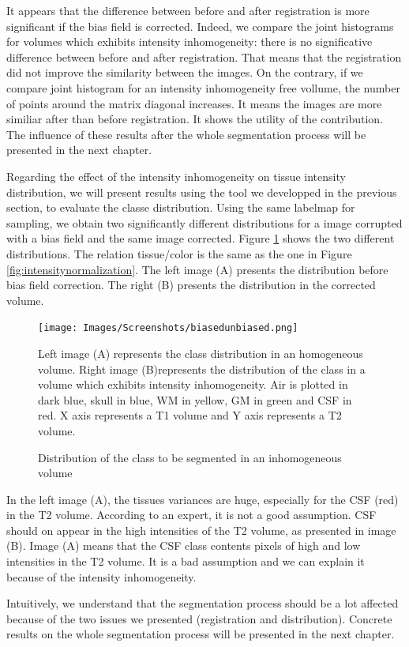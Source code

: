 It appears that the difference between before and after registration is more significant if the bias field is corrected. Indeed, we compare the joint histograms for volumes which exhibits intensity inhomogeneity: there is no significative difference between before and after registration. That means that the registration did not improve the similarity between the images. On the contrary, if we compare joint histogram for an intensity inhomogeneity free vollume, the number of points around the matrix diagonal increases. It means the images are more similiar after than before registration. It shows the utility of the contribution. The influence of these results after the whole segmentation process will be presented in the next chapter.
\par
Regarding the effect of the intensity inhomogeneity on tissue intensity distribution, we will present results using the tool we developped in the previous section, to evaluate the classe distribution.
Using the same labelmap for sampling, we obtain two significantly different distributions for a image corrupted with a bias field and the same image corrected. Figure \ref{fig:biasedunbiased} shows the two different distributions. The relation tissue/color is the same as the one in Figure \ref{fig:intensitynormalization}. The left image (A) presents the distribution before bias field correction. The right (B) presents the distribution in the corrected volume.

\begin{figure}\centering
  \texttt{[image: Images/Screenshots/biasedunbiased.png]}
  \caption{Distribution of the class to be segmented in an inhomogeneous volume}{Left image (A) represents the class distribution in an homogeneous volume. Right image (B)represents the distribution of the class in a volume which exhibits intensity inhomogeneity. Air is plotted in dark blue, skull in blue, WM in yellow, GM in green and CSF in red. X axis represents a T1 volume and Y axis represents a T2 volume.}\label{fig:biasedunbiased}
\end{figure}
In the left image (A), the tissues variances are huge, especially for the CSF (red) in the T2 volume. According to an expert, it is not a good assumption. CSF should on appear in the high intensities of the T2 volume, as presented in image (B). Image (A) means that the CSF class contents pixels of high and low intensities in the T2 volume. It is a bad assumption and we can explain it because of the intensity inhomogeneity.
\par
Intuitively, we understand that the segmentation process should be a lot affected because of the two issues we presented (registration and distribution). Concrete results on the whole segmentation process will be presented in the next chapter.
